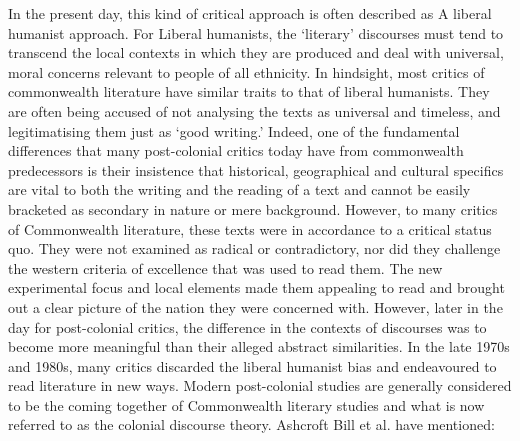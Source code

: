In  the  present  day,  this  kind  of  critical  approach  is  often  described  as  A  liberal  humanist  approach.  For  Liberal  humanists,  the  ‘literary’  discourses  must  tend  to  transcend  the  local  contexts  in  which  they  are  produced  and  deal  with  universal,  moral  concerns  relevant  to  people  of  all  ethnicity.  In  hindsight,  most  critics  of  commonwealth  literature  have  similar  traits  to  that  of  liberal  humanists.  They  are  often  being  accused  of  not  analysing  the  texts  as  universal  and  timeless,  and  legitimatising  them  just  as  ‘good  writing.’  Indeed,  one  of  the  fundamental  differences  that  many  post-colonial  critics  today  have  from  commonwealth  predecessors  is  their  insistence  that  historical,  geographical  and  cultural  specifics  are  vital  to  both  the  writing  and  the  reading  of  a  text  and  cannot  be  easily  bracketed  as  secondary  in  nature  or  mere  background.  However,  to  many  critics  of  Commonwealth  literature,  these  texts  were  in  accordance  to  a  critical  status  quo.  They  were  not  examined  as  radical  or  contradictory,  nor  did  they  challenge  the  western  criteria  of  excellence  that  was  used  to  read  them.  The  new  experimental  focus  and  local  elements  made  them  appealing  to  read  and  brought  out  a  clear  picture  of  the  nation  they  were  concerned  with.  However,  later  in  the  day  for  post-colonial  critics,  the  difference  in  the  contexts  of  discourses  was  to  become  more  meaningful  than  their  alleged  abstract  similarities.  In  the  late  1970s  and  1980s,  many  critics  discarded  the  liberal  humanist  bias  and  endeavoured  to  read  literature  in  new  ways.  Modern  post-colonial  studies  are  generally  considered  to  be  the  coming  together  of  Commonwealth  literary  studies  and  what  is  now  referred  to  as  the  colonial  discourse  theory.  Ashcroft  Bill  et  al.  have  mentioned:


